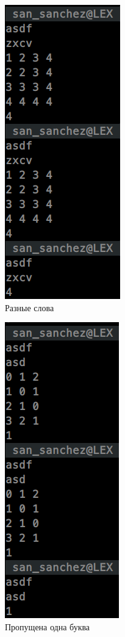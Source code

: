 \begin{figure}[H]
\centering
\includegraphics[scale=0.75]{./pict/work_diff_words.png}
\caption{Разные слова}
\end{figure}
\begin{figure}[H]
\centering
\includegraphics[scale=0.75]{./pict/work_without_symb.png}
\caption{Пропущена одна буква}
\end{figure}


